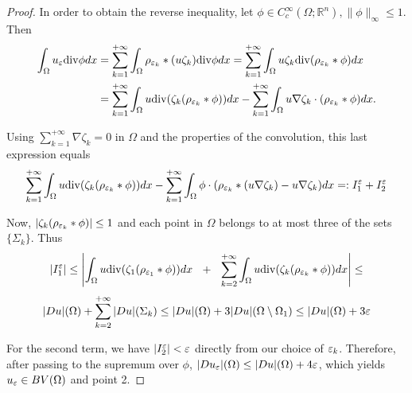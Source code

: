 \begin{proof}
In order to obtain the reverse inequality, let $\phi \in C^{\infty}_{c}(\Omega; \mathbb{R}^{n}), \|\phi\|_{\infty} \le 1$. Then
\begin{align*} \int_{\Omega} u_{\varepsilon} \mathrm{div}\phi dx & = \sum_{k=1}^{+\infty} \int_{\Omega} \rho_{\varepsilon_{k}} \ast (u\zeta_{k}) \mathrm{div}\phi dx = \sum_{k=1}^{+\infty} \int_{\Omega} u \zeta_{k} \mathrm{div}(\rho_{\varepsilon_{k}} \ast \phi) dx \\
& = \sum_{k=1}^{+\infty} \int_{\Omega} u \mathrm{div}(\zeta_{k} (\rho_{\varepsilon_{k}} \ast \phi)) dx - \sum_{k=1}^{+\infty} \int_{\Omega} u \nabla \zeta_{k} \cdot (\rho_{\varepsilon_{k}} \ast \phi) dx. 
\end{align*}

Using $\displaystyle \sum_{k = 1}^{+\infty} \nabla \zeta_{k} = 0$ in $\Omega$ and the properties of the convolution, this last expression equals
\[ \sum_{k=1}^{+\infty} \int_{\Omega} u \mathrm{div}(\zeta_{k} (\rho_{\varepsilon_{k}} \ast \phi)) dx - \sum_{k=1}^{+\infty} \int_{\Omega} \phi \cdot (\rho_{\varepsilon_{k}} \ast (u \nabla \zeta_{k}) - u \nabla \zeta_{k}) dx =: I_{1}^{\varepsilon} + I_{2}^{\varepsilon} \] 

Now, $|\zeta_{k}(\rho_{\varepsilon_{k}} \ast \phi)| \le 1$ and each point in $\Omega$ belongs to at most three of the sets $\{\Sigma_{k}\}$. Thus
\[ |I_{1}^{\varepsilon}| \le \left |\int_{\Omega} u \mathrm{div}(\zeta_{1} (\rho_{\varepsilon_{1}} \ast \phi)) dx \ \ + \ \ \sum_{k=2}^{+\infty} \int_{\Omega} u \mathrm{div}(\zeta_{k} (\rho_{\varepsilon_{k}} \ast \phi)) dx \right | \le \]
\[ |Du|(\Omega) + \sum_{k = 2}^{+\infty} |Du|(\Sigma_{k}) \le |Du|(\Omega) + 3|Du|(\Omega \setminus \Omega_{1}) \le |Du|(\Omega) + 3 \varepsilon \]

For the second term, we have $|I_{2}^{\varepsilon}| < \varepsilon$ directly from our choice of $\varepsilon_{k}$.
Therefore, after passing to the supremum over $\phi$, $|Du_{\varepsilon}|(\Omega) \le |Du|(\Omega) + 4 \varepsilon$, which yields $u_{\varepsilon} \in BV(\Omega)$ and point 2. 
\end{proof}

